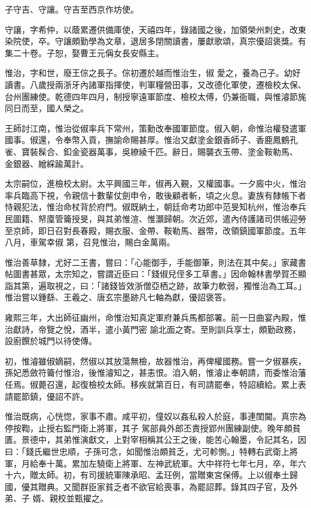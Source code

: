 \begin{pinyinscope}
 子守吉、守讓。守吉至西京作坊使。



 守讓，字希仲，以蔭累遷供備庫使，天禧四年，錄諸國之後，加領榮州刺史，改東染院使，卒。守讓頗勤學為文章，退居多閉關讀書，屢獻歌頌，真宗優詔褒獎。有集二十卷。子恕，娶曹王元偁女長安縣主。



 惟治，字和世，廢王倧之長子。倧初遷於越而惟治生，俶
 愛之，養為己子。幼好讀書。八歲授兩浙牙內諸軍指揮使，判軍糧營田事，又改德化軍使，遷檢校太保、台州團練使。乾德四年四月，制授寧遠軍節度、檢校太傅，仍兼衙職，與惟濬節旄同日而至，國人榮之。



 王師討江南，惟治從俶率兵下常州，策勳改奉國軍節度。俶入朝，命惟治權發遣軍國事。俶還，令奉幣入貢，撫諭命賜甚厚。惟治又獻塗金銀香師子、香鹿鳳鶴孔雀、寶裝髹合、釦金瓷器萬事，吳繚綾千匹。辭日，賜襲衣玉帶、塗金鞍勒馬、
 金銀器、繒綵踰萬計。



 太宗嗣位，進檢校太尉。太平興國三年，俶再入覲，又權國事。一夕廄中火，惟治率兵臨高下視，令親信十數輩仗劍申令，敢後顧者斬，頃之火息。妻族有隸帳下者恃親犯法，惟治命杖背於府門。俶既納土，朝廷命考功郎中范旻知杭州，惟治奉兵民圖籍、帑廩管籥授旻，與其弟惟渲、惟灝歸朝。次近郊，遣內侍護諸司供帳迎勞至京師，即日召對長春殿，賜衣服、金帶、鞍勒馬、器幣，改領鎮國軍節度。五年八月，車駕幸俶
 第，召見惟治，賜白金萬兩。



 惟治善草隸，尤好二王書，嘗曰：「心能御手，手能御筆，則法在其中矣。」家藏書帖圖書甚眾，太宗知之，嘗謂近臣曰：「錢俶兒侄多工草書。」因命翰林書學賀丕顯詣其第，遍取視之，曰：「諸錢皆效浙僧亞栖之跡，故筆力軟弱，獨惟治為工耳。」惟治嘗以鍾繇、王羲之、唐玄宗墨跡凡七軸為獻，優詔褒答。



 雍熙三年，大出師征幽州，命惟治知真定軍府兼兵馬都部署。前一日曲宴內殿，惟治獻詩，帝覽之悅，酒半，遣小黃門密
 諭北面之寄。至則訓兵享士，頗勤政務，設廚饌於城門以待使傳。



 初，惟濬雖俶嫡嗣，然俶以其放蕩無檢，故器惟治，再俾權國務。嘗一夕俶暴疾，孫妃悉斂符籥付惟治，後惟濬知之，甚恚恨。洎入朝，惟濬止奉朝請，而委惟治藩任焉。俶薨召還，起復檢校太師。移疾就第百日，有司請罷奉，特詔續給。累上表請罷節鎮，優詔不許。



 惟治既病，心恍惚，家事不肅。咸平初，僮奴以姦私殺人於庭，事連閨閫。真宗為停按鞫，止授右監門衛上將軍，其子
 駕部員外郎丕責授郢州團練副使。晚年頗貧匱。景德中，其弟惟演獻文，上對宰相稱其公王之後，能苦心翰墨，令記其名，因曰：「錢氏繼世忠順，子孫可念，如聞惟治頗貧乏，尤可軫惻。」特轉右武衛上將軍，月給奉十萬。累加左驍衛上將軍、左神武統軍。大中祥符七年七月，卒，年六十六，贈太師。初，有司援統軍陳承昭、孟玨例，當贈東宮保傅。上以俶奉土歸國，優其贈典。又聞群臣家貧乏者不欲官給喪事，為罷詔葬。錄其四子官，及外弟、子
 婿、親校並甄擢之。




\end{pinyinscope}

